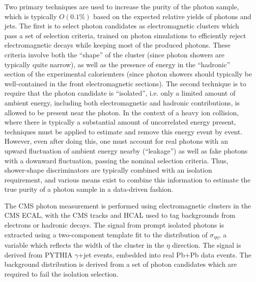 Two primary techniques are used to increase the purity of the photon sample, which is typically
$O(0.1\%)$ based on the expected relative yields of photons and jets.  The first is to select
photon candidates as electromagnetic clusters which pass a set of selection criteria, trained on
photon simulations to efficiently reject electromagnetic decays while keeping most of the
produced photons.  These criteria involve both the ``shape'' of the cluster (since photon showers
are typically quite narrow), as well as the presence of energy in the ``hadronic'' section of the
experimental caloriemters (since photon showers should typically be well-contained in the front
electromagnetic sections).
The second technique is to require that the photon candidate is ``isolated'', i.e. only a limited
amount of ambient energy, including both electromagnetic and hadronic contributions, 
is allowed to be present near the photon.  In the context of a heavy ion collision, where there
is typically a substantial amount of uncorrelated energy present, techniques must be applied to
estimate and remove this energy event by event.  However, even after doing this, one must account
for real photons with an upward fluctuation of ambient energy nearby (``leakage'') as well
as fake photons with a downward fluctuation, passing the nominal selection criteria. 
Thus, shower-shape discriminators are typically combined with an isolation requirement, and various
means exist to combine this information to estimate the true purity of a photon sample in a 
data-driven fashion.

The CMS photon measurement is performed using electromagnetic clusters in the CMS ECAL, with the
CMS tracks and HCAL used to tag backgrounds from electrons or hadronic decays.  
The signal from prompt isolated photons is extracted using a two-component template fit to
the distribution of $\sigma_{\eta\eta}$, a variable which reflects the width of the cluster
in the $\eta$ direction.  The signal is derived from PYTHIA $\gamma$+jet events, embedded 
into real Pb+Pb data events.  The background distribution is derived from a set of photon
candidates which are required to fail the isolation selection.
